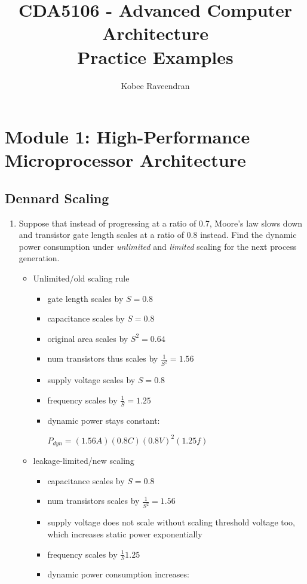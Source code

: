 \documentclass[12pt]{article}
\title{CDA5106 - Advanced Computer Architecture \\ Practice Examples}
\author{Kobee Raveendran}
\date{}
\begin{document}
    \maketitle

    \section{Module 1: High-Performance Microprocessor Architecture}

    \subsection{Dennard Scaling}

    \begin{enumerate}
        \item Suppose that instead of progressing at a ratio of 0.7, Moore’s law slows down and transistor gate length scales at a ratio of 0.8 instead. Find the dynamic power consumption under \textit{unlimited} and \textit{limited} scaling for the next process generation.

        \begin{itemize}
            \item Unlimited/old scaling rule
            \begin{itemize}
                \item gate length scales by $S = 0.8$
                \item capacitance scales by $S = 0.8$
                \item original area scales by $S^2 = 0.64$
                \item num transistors thus scales by $\frac{1}{S^2} = 1.56$
                \item supply voltage scales by $S = 0.8$
                \item frequency scales by $\frac{1}{S} = 1.25$
                \item dynamic power stays constant:
            
                $P_{dyn} = (1.56A)(0.8C)(0.8V)^2(1.25f)$
            \end{itemize}
            
            \item leakage-limited/new scaling
            \begin{itemize}
                \item capacitance scales by $S = 0.8$
                \item num transistors scales by $\frac{1}{S^2} = 1.56$
                \item supply voltage does not scale without scaling threshold voltage too, which increases static power exponentially
                \item frequency scales by $\frac{1}{S} 1.25$
                \item dynamic power consumption increases:


\end{itemize}
\end{itemize}
\end{enumerate}
\end{document}
